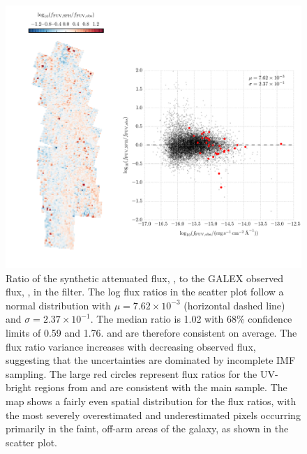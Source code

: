 \begin{figure}
\centering
\includegraphics[width=\textwidth]{m31flux-figures/flux_fuv_sfh-vs-obs.pdf}
\caption[Ratio of the synthetic flux to the observed flux in the \fuv{}
filter.]{Ratio of the synthetic attenuated flux, \ffuvsfh{}, to the GALEX
    observed flux, \ffuvobs{}, in the \fuv{} filter. The log flux ratios in the
    scatter plot follow a normal distribution with $\mu = 7.62\times 10^{-3}$
    (horizontal dashed line) and $\sigma = 2.37\times 10^{-1}$. The median
    ratio is 1.02 with 68\% confidence limits of 0.59 and 1.76. \ffuvsfh{} and
    \ffuvobs{} are therefore consistent on average. The flux ratio variance
    increases with decreasing observed flux, suggesting that the uncertainties
    are dominated by incomplete IMF sampling. The large red circles represent
    flux ratios for the UV-bright regions from \citet{Simones:2014} and are
    consistent with the main sample. The map shows a fairly even spatial
    distribution for the flux ratios, with the most severely overestimated and
    underestimated pixels occurring primarily in the faint, off-arm areas of
    the galaxy, as shown in the scatter plot.
}
\label{fig:mfx:fuvfluxratio}
\end{figure}


